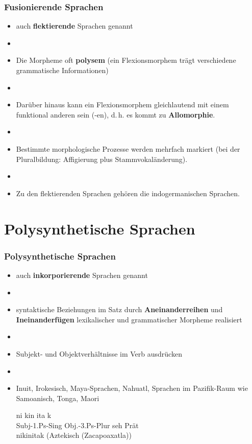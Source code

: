 \begin{frame}
\frametitle{Fusionierende Sprachen}

\begin{itemize}
	\item auch \textbf{flektierende} Sprachen genannt
	\item[]
	\item Die Morpheme oft \textbf{polysem} (ein Flexionsmorphem trägt verschiedene grammatische Informationen)
	\item[]
	\item Darüber hinaus kann ein Flexionsmorphem gleichlautend mit einem funktional anderen sein (\zB -en), d.\,h. es kommt zu \textbf{Allomorphie}.
	\item[]
	\item Bestimmte morphologische Prozesse werden mehrfach markiert (\zB bei der Pluralbildung: Affigierung plus Stammvokaländerung).
	\item[]
	\item Zu den flektierenden Sprachen gehören die indogermanischen Sprachen.
\end{itemize}


\end{frame}


\section{Polysynthetische Sprachen}


\begin{frame}
\frametitle{Polysynthetische Sprachen}

\begin{itemize}
	\item auch \textbf{inkorporierende} Sprachen genannt
	\item[]
	\item syntaktische Beziehungen im Satz durch \textbf{Aneinanderreihen} und \textbf{Ineinanderfügen} lexikalischer und grammatischer Morpheme realisiert
	\item[]
	\item \zB Subjekt- und Objektverhältnisse im Verb ausdrücken
	\item[]
	\item Inuit, Irokesisch, Maya-Sprachen, Nahuatl, Sprachen im Pazifik-Raum wie Samoanisch, Tonga, Maori
	
	\ea
	\glll	ni kin ita k \\
			{Subj-1.Ps-Sing} {Obj.-3.Ps-Plur} seh Prät \\
			{nikinitak (Aztekisch (Zacapoaxatla))} \\
	
	
\end{itemize}


\end{frame}


